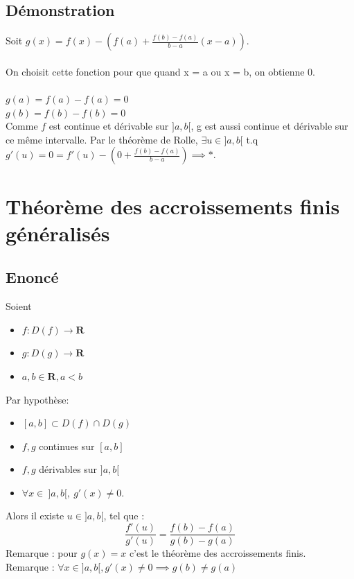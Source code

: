 \documentclass{article}
\begin{document}
\subsection{Démonstration}

Soit $ g(x) = f(x) - (f(a) + \frac{f(b) - f(a)}{b - a}(x-a))$.\\\\
On choisit cette fonction pour que quand x = a ou x = b, on obtienne 0.\\\\
$ g(a) = f(a) - f(a) = 0 $\\
$ g(b) = f(b) - f(b) = 0 $\\
Comme $f$ est continue et dérivable sur $ ]a, b[$, g est aussi continue et dérivable sur ce même intervalle. Par le théorème de Rolle, $ \exists u \in ]a, b[ $ t.q $ g'(u) = 0 = f'(u) - (0 + \frac{f(b) - f(a)}{b - a}) \implies *$.

\newpage

\section{Théorème des accroissements finis généralisés}

\subsection{Enoncé}

Soient 
\begin{itemize}
    \item $ f : D(f) \to \mathbf{R} $
    \item $ g : D(g) \to \mathbf{R} $
    \item $ a, b \in \mathbf{R}, a < b $
\end{itemize}
Par hypothèse:
\begin{itemize}
    \item $ [a,b] \subset D(f) \cap D(g) $
    \item $ f, g $ continues sur $ [a, b] $
    \item $ f, g $ dérivables sur $ ]a, b[ $
    \item $ \forall x \in\ ]a, b[,\ g'(x) \neq 0. $
\end{itemize}
Alors il existe $ u \in ]a, b[ $, tel que :
\[ \frac{f'(u)}{g'(u)} = \frac{f(b) - f(a)}{g(b) - g(a)}\]
Remarque : pour $ g(x) = x $ c'est le théorème des accroissements finis.\\
Remarque : $ \forall x \in ]a, b[, g'(x) \neq 0 \implies g(b) \neq g(a)$
\end{document}
